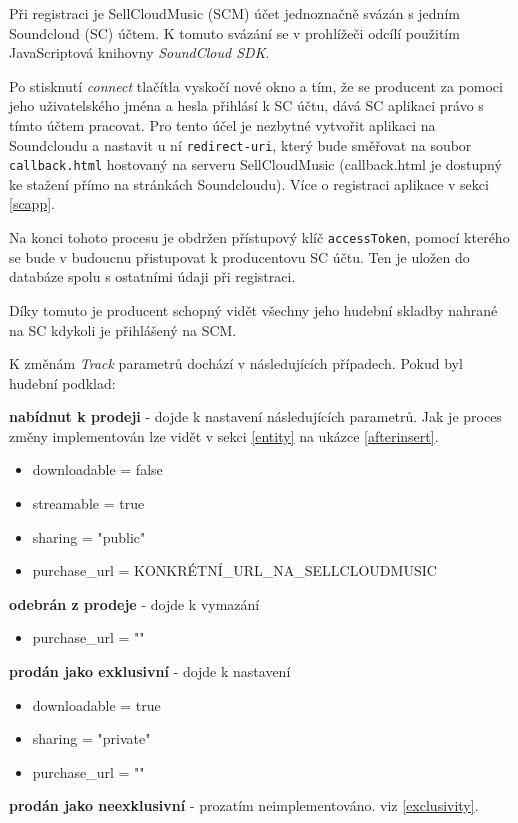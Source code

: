 \documentclass[12pt]{article}
\begin{document}
Při registraci je SellCloudMusic (SCM) účet jednoznačně svázán s jedním Soundcloud (SC) účtem. K tomuto svázání se v prohlížeči odcílí použitím JavaScriptová knihovny \emph{SoundCloud SDK}.

Po stisknutí \emph{connect} tlačítla vyskočí nové okno a tím, že se producent za pomoci jeho uživatelského jména a hesla přihlásí k SC účtu, dává SC aplikaci právo s tímto účtem pracovat. Pro tento účel je nezbytné vytvořit aplikaci na Soundcloudu a nastavit u ní \texttt{redirect-uri}, který bude směřovat na soubor \texttt{callback.html} hostovaný na serveru SellCloudMusic (callback.html je dostupný ke stažení přímo na stránkách Soundcloudu). Více o registraci aplikace v sekci \ref{scapp}.

Na konci tohoto procesu je obdržen přístupový klíč \texttt{accessToken}, pomocí kterého se bude v budoucnu přistupovat k producentovu SC účtu. Ten je uložen do databáze spolu s ostatními údaji při registraci.

Díky tomuto je producent schopný vidět všechny jeho hudební skladby nahrané na SC kdykoli je přihlášený na SCM. 

K změnám \emph{Track} parametrů dochází v následujících případech. Pokud byl hudební podklad:

\begin{description}
\item{\textbf{nabídnut k prodeji}} - dojde k nastavení následujících parametrů. Jak je proces změny implementován lze vidět v sekci \ref{entity} na ukázce \ref{afterinsert}.
  \begin{itemize}
  \item downloadable = false
  \item streamable = true
  \item sharing = "public"
  \item purchase\_url = KONKRÉTNÍ\_URL\_NA\_SELLCLOUDMUSIC
  \end{itemize}

\item{\textbf{odebrán z prodeje}} - dojde k vymazání
  \begin{itemize}
  \item purchase\_url = ""
  \end{itemize}

\item{\textbf{prodán jako exklusivní}} - dojde k nastavení
  \begin{itemize}
  \item downloadable = true
  \item sharing = "private"
  \item purchase\_url = ""
  \end{itemize}

\item{\textbf{prodán jako neexklusivní}} - prozatím neimplementováno. viz \ref{exclusivity}.
\end{description}
\end{document}
